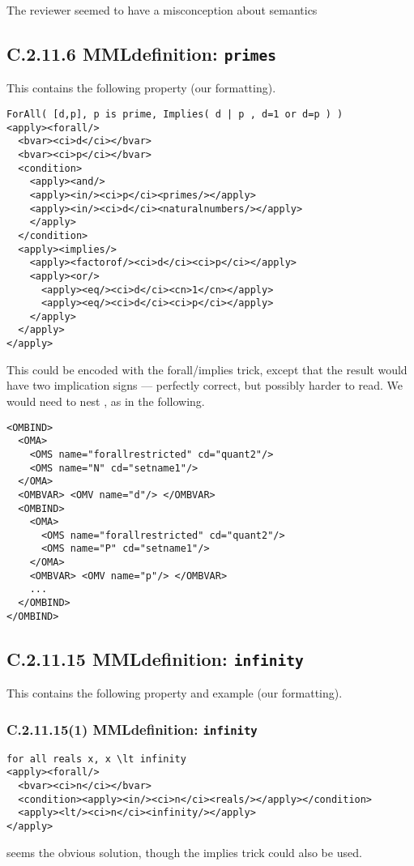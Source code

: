 \documentclass{llncs}
\begin{document}
\begin{newpart}{The reviewer seemed to have a misconception about semantics}
\subsection{C.2.11.6 MMLdefinition: {\tt primes}}\label{C2116}
This contains the following property (our formatting).
\begin{lstlisting}[language=MathML2]
ForAll( [d,p], p is prime, Implies( d | p , d=1 or d=p ) ) 
<apply><forall/>
  <bvar><ci>d</ci></bvar>
  <bvar><ci>p</ci></bvar>
  <condition>
    <apply><and/>
    <apply><in/><ci>p</ci><primes/></apply>
    <apply><in/><ci>d</ci><naturalnumbers/></apply>
    </apply>
  </condition>
  <apply><implies/>
    <apply><factorof/><ci>d</ci><ci>p</ci></apply>
    <apply><or/>
      <apply><eq/><ci>d</ci><cn>1</cn></apply>
      <apply><eq/><ci>d</ci><ci>p</ci></apply>
    </apply>
  </apply>
</apply>
\end{lstlisting}
This could be encoded with the forall/implies trick, except that the result
would have two implication signs --- perfectly correct, but possibly harder to
read. We would need to nest {}, as in the following.
\begin{lstlisting}
<OMBIND>
  <OMA>
    <OMS name="forallrestricted" cd="quant2"/>
    <OMS name="N" cd="setname1"/>
  </OMA>
  <OMBVAR> <OMV name="d"/> </OMBVAR>
  <OMBIND>
    <OMA>
      <OMS name="forallrestricted" cd="quant2"/>
      <OMS name="P" cd="setname1"/>
    </OMA>
    <OMBVAR> <OMV name="p"/> </OMBVAR>
    ...
  </OMBIND>
</OMBIND> 
\end{lstlisting}
\subsection{C.2.11.15 MMLdefinition: {\tt infinity}}\label{C21115}
This contains the following property and example (our formatting).
\subsubsection{C.2.11.15(1) MMLdefinition: {\tt infinity}}\label{C211151}
\begin{lstlisting}[language=MathML2] 
    for all reals x, x \lt infinity
<apply><forall/>
  <bvar><ci>n</ci></bvar>
  <condition><apply><in/><ci>n</ci><reals/></apply></condition>
  <apply><lt/><ci>n</ci><infinity/></apply>
</apply>
\end{lstlisting}
{} seems the obvious solution, though the implies trick
could also be used.

\end{newpart}
\end{document}
